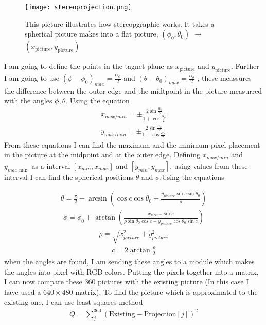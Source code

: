 \documentclass[a4paper,11pt,english]{report}
\begin{document}
\begin{figure}[h]
  \centering
  \texttt{[image: stereoprojection.png]}
  \caption{This picture illustrates how stereopgraphic works. It takes a
    spherical picture makes into a flat picture, \((\phi_{0}, \theta_{0})\)
    \(\to\) \((x_{\mathrm{picture}}, y_{\mathrm{picture}})\)}
  \end{figure}
I am going to define the points in the tagnet plane as \(x_{\mathrm{picture}}\)
and \(y_{\mathrm{picture}}\). Further I am going to use \((\phi - \phi_{0})_{max} =
\frac{\alpha_{\phi}}{2}\) and \((\theta - \theta_{0})_{max} =
\frac{\alpha_{\theta}}{2}\) , these meassures the difference between the outer edge
and the midtpoint in the picture measurred with the angles \(\phi, \theta\).
 Using the equation
\begin{align}
  x_{max/min} = \pm \frac{2\sin{\frac{\alpha_{\phi}}{2}}}{1+
  \cos{\frac{\alpha_{\phi}}{2}}}
  \\
  y_{max/min}=  \pm \frac{2\sin{\frac{\alpha_{\theta}}{2}}}{1+
  \cos{\frac{\alpha_{\theta}}{2}}}
\end{align}
From these equations I can find the maximum and the minimum pixel placement in
the picture at the midpoint and at the outer edge. Defining \(x_{max/min}\) and
\(y_{max\min}\) as a interval \([x_{min}, x_{max}]\) and \([y_{min},
y_{max}]\), using values from these interval I can find 
the spherical positions \(\theta\) and \(\phi\).Using the equations

\begin{align}
  \theta = \frac{\pi}{2}  -\arcsin{(\cos{c}\cos{\theta_{0}} + \frac{y_{picture}
  \sin{c}\sin{\theta_{0}}}{\rho})}
\end{align}
\begin{align}
  \phi = \phi_{0} +
  \arctan{(\frac{x_{picture}\sin{c}}{\rho\sin{\theta_{0}}\cos{c} -
  y_{picture}\cos{\theta_{0}}\sin{c}})}
\end{align}
\begin{align}
  \rho = \sqrt{x^{2}_{picture} + y^{2}_{picture}}
\end{align}
\begin{align}
  c = 2\arctan{\frac{\rho}{2}}
\end{align}
when the angles are found, I am sending these angles to a module which makes
the angles into pixel with RGB colors. Putting the pixels together into a
matrix, I can now compare these 360 pictures with the existing picture (In this case I
have used a \(640\times480\) matrix). To find the picture which is approximated
to the existing one, I can use least squares method
\begin{align}
  Q = \sum_{j}^{360}(\mathrm{Existing} - \mathrm{Projection}[j])^{2}
\end{align}
\end{document}
